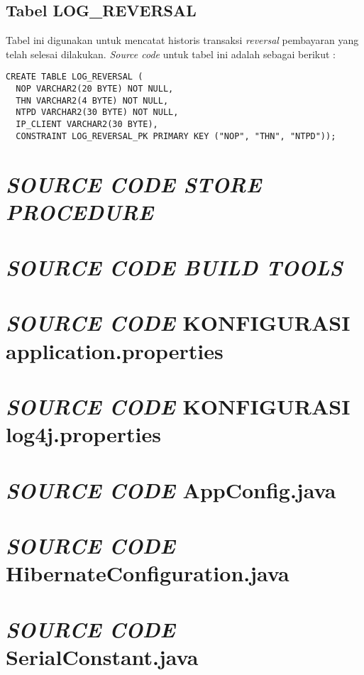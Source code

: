 \documentclass[pdftex,12pt, oneside]{article}
\begin{document}
  \subsection{Tabel LOG\_REVERSAL}
  
  Tabel ini digunakan untuk mencatat historis transaksi \textit{reversal} pembayaran yang telah selesai dilakukan. \textit{Source code} untuk tabel ini adalah sebagai berikut :
  
  \begin{lstlisting}
CREATE TABLE LOG_REVERSAL (	
  NOP VARCHAR2(20 BYTE) NOT NULL,
  THN VARCHAR2(4 BYTE) NOT NULL,
  NTPD VARCHAR2(30 BYTE) NOT NULL,
  IP_CLIENT VARCHAR2(30 BYTE),
  CONSTRAINT LOG_REVERSAL_PK PRIMARY KEY ("NOP", "THN", "NTPD"));    
  \end{lstlisting}


\section{\textit{SOURCE CODE STORE PROCEDURE}}


\section{\textit{SOURCE CODE BUILD TOOLS}}


\section{\textit{SOURCE CODE} KONFIGURASI application.properties}


\section{\textit{SOURCE CODE} KONFIGURASI log4j.properties}


\section{\textit{SOURCE CODE} AppConfig.java}


\section{\textit{SOURCE CODE} HibernateConfiguration.java}


\section{\textit{SOURCE CODE} SerialConstant.java}
\end{document}
